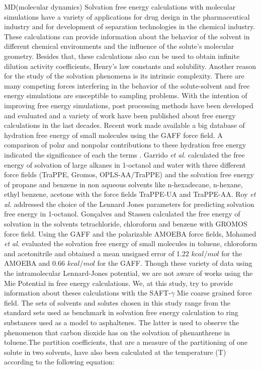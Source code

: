 MD(molecular dynamics)
Solvation free energy calculations with molecular simulations have a variety of applications for drug design in the pharmaceutical industry  and for development of separation technologies in the chemical industry. These calculations can provide information about the behavior of the solvent in different chemical environments and the influence of the solute's molecular geometry. Besides that, these calculations also can be used to obtain infinite dilution activity coefficients, Henry's law constants and solubility. Another reason for the study of the solvation phenomena is its intrinsic complexity. There are many competing forces interfering in the behavior of the solute-solvent and free energy simulations are susceptible to sampling problems. With the intention of improving free energy simulations, post processing methods \cite{mbar,bareva,dexp,gdel} have been developed and evaluated and a variety of work have been published about free energy calculations in the last decades. Recent work \cite{mobley2014,mobley2017} made available a big database of hydration free energy of small molecules using the GAFF force field. A comparison of polar and nonpolar contributions to these hydration free energy indicated the significance of each the terms  \cite{izairi2017}. Garrido \textit{et al.} \citep{garrido,garrido2011} calculated the free energy of solvation of large alkanes in 1-octanol and water with three different force fields (TraPPE, Gromos, OPLS-AA/TraPPE) and the solvation free energy of propane and benzene in non aqueous solvents like n-hexadecane, n-hexane, ethyl benzene, acetone  with the force fields TraPPE-UA and TraPPE-AA. Roy \textit{et al.} \citep{roy2017} addressed the choice of the Lennard Jones parameters for predicting solvation free energy in 1-octanol. Gon\c{c}alves and Stassen \citep{goncalves} calculated the free energy of solvation in the solvents tetrachloride, chloroform and benzene with GROMOS force field. Using the GAFF and the polarizable AMOEBA force fields, Mohamed \textit{et al.} \citep{mohamed2016} evaluated the solvation free energy of small molecules in toluene, chloroform and acetonitrile and obtained a mean unsigned error of 1.22 $kcal/mol$ for the AMOEBA and 0.66 $kcal/mol$ for the GAFF. Though these variety of data using the intramolecular Lennard-Jones potential, we are not aware of works using the Mie Potential\cite{MIE} in free energy calculations. We, at this study, try to provide information about theses calculations with the SAFT-$\gamma$ Mie coarse grained force field. The sets of solvents and solutes chosen in this study range from the standard sets used as benchmark in solvation free energy calculation to ring substances used as a model to asphaltenes. The latter is used to observe the phenomenon that carbon dioxide has on the solvation of phenanthrene in toluene.The partition coefficients, that are a measure of the partitioning of one solute in two solvents, have also been calculated at the temperature (T) according to the following equation:

